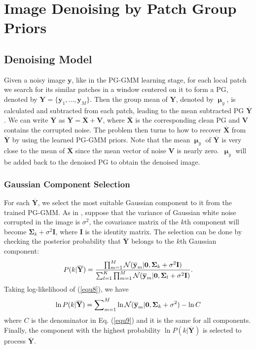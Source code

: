 \section{Image Denoising by Patch Group Priors}
\subsection{Denoising Model}
Given a noisy image $\mathbf{y}$, like in the PG-GMM learning stage, for each local patch we search for its similar patches in a window centered on it to form a PG, denoted by $\mathbf{Y} = \{\mathbf{y}_{1},...,\mathbf{y}_{M}\}$. Then the group mean of $\mathbf{Y}$, denoted by $\boldsymbol{\upmu}_{y}$, is calculated and subtracted from each patch, leading to the mean subtracted PG $\mathbf{\overline{Y}}$. We can write $\mathbf{\overline{Y}}$ as $\mathbf{\overline{Y}}=\mathbf{\overline{X}}+\mathbf{V}$, where $\mathbf{\overline{X}}$ is the corresponding clean PG and $\mathbf{V}$ contains the corrupted noise. The problem then turns to how to recover $\mathbf{\overline{X}}$ from $\mathbf{\overline{Y}}$ by using the learned PG-GMM priors. Note that the mean $\boldsymbol{\upmu}_{y}$ of $\mathbf{\overline{Y}}$  is very close to the mean of $\mathbf{\overline{X}}$ since the mean vector of noise $\mathbf{V}$ is nearly zero.\ $\boldsymbol{\upmu}_{y}$ will be added back to the denoised PG to obtain the denoised image. 
\vspace{-0.1in}
\subsubsection{Gaussian Component Selection}
For each $\mathbf{\overline{Y}}$, we select the most suitable Gaussian component to it from the trained PG-GMM. As in \cite{epll}, suppose that the variance of Gaussian white noise corrupted in the image is $\sigma^{2}$, the covariance matrix of the $k$th component will become $\mathbf{\Sigma}_{k}+\sigma^{2}\mathbf{I}$, where $\mathbf{I}$ is the identity matrix. The selection can be done by checking the posterior probability that $\mathbf{\overline{Y}}$ belongs to the $k$th Gaussian component:
\begin{equation}\label{equ8}
\setlength{\abovedisplayskip}{3pt}
\setlength{\belowdisplayskip}{4pt}
P(k|\mathbf{\overline{Y}})=\frac{\prod_{m=1}^{M}\mathcal{N}(\mathbf{\overline{y}}_{m}|\mathbf{0},\mathbf{\Sigma}_{k}+\sigma^{2}\mathbf{I})}{\sum_{l=1}^{K}\prod_{m=1}^{M}\mathcal{N}(\mathbf{\overline{y}}_{m}|\mathbf{0},\mathbf{\Sigma}_{l}+\sigma^{2}\mathbf{I})}.
\end{equation}
Taking log-likelihood of (\ref{equ8}), we have
\begin{equation}\label{equ9}
\setlength{\abovedisplayskip}{3pt}
\setlength{\belowdisplayskip}{3pt}
\ln P(k|\mathbf{\overline{Y}}) = \sum\nolimits_{m=1}^{M}\ln\mathcal{N}(\mathbf{\overline{y}}_{m}|\mathbf{0},\mathbf{\Sigma}_{k}+\sigma^{2})-\ln{C}
\end{equation}
where $C$ is the denominator in Eq. (\ref{equ9}) and it is the same for all components. Finally, the component with the highest probability $\ln P(k|\mathbf{\overline{Y}})$ is selected to process $\mathbf{\overline{Y}}$.
\vspace{-0.1in}
